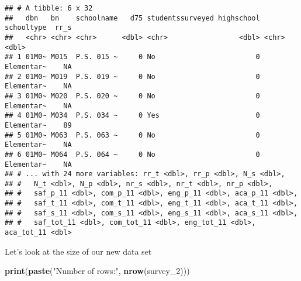 \documentclass[]{article}
\newenvironment{Shaded}{\begin{snugshade}}{\end{snugshade}}
\newcommand{\DecValTok}[1]{\textcolor[rgb]{0.00,0.00,0.81}{#1}}
\newcommand{\KeywordTok}[1]{\textcolor[rgb]{0.13,0.29,0.53}{\textbf{#1}}}
\newcommand{\NormalTok}[1]{#1}
\newcommand{\OperatorTok}[1]{\textcolor[rgb]{0.81,0.36,0.00}{\textbf{#1}}}
\newcommand{\StringTok}[1]{\textcolor[rgb]{0.31,0.60,0.02}{#1}}
\begin{document}
\begin{Shaded}
\end{Shaded}

\begin{verbatim}
## # A tibble: 6 x 32
##   dbn   bn    schoolname   d75 studentssurveyed highschool schooltype  rr_s
##   <chr> <chr> <chr>      <dbl> <chr>                 <dbl> <chr>      <dbl>
## 1 01M0~ M015  P.S. 015 ~     0 No                        0 Elementar~    NA
## 2 01M0~ M019  P.S. 019 ~     0 No                        0 Elementar~    NA
## 3 01M0~ M020  P.S. 020 ~     0 No                        0 Elementar~    NA
## 4 01M0~ M034  P.S. 034 ~     0 Yes                       0 Elementar~    89
## 5 01M0~ M063  P.S. 063 ~     0 No                        0 Elementar~    NA
## 6 01M0~ M064  P.S. 064 ~     0 No                        0 Elementar~    NA
## # ... with 24 more variables: rr_t <dbl>, rr_p <dbl>, N_s <dbl>,
## #   N_t <dbl>, N_p <dbl>, nr_s <dbl>, nr_t <dbl>, nr_p <dbl>,
## #   saf_p_11 <dbl>, com_p_11 <dbl>, eng_p_11 <dbl>, aca_p_11 <dbl>,
## #   saf_t_11 <dbl>, com_t_11 <dbl>, eng_t_11 <dbl>, aca_t_11 <dbl>,
## #   saf_s_11 <dbl>, com_s_11 <dbl>, eng_s_11 <dbl>, aca_s_11 <dbl>,
## #   saf_tot_11 <dbl>, com_tot_11 <dbl>, eng_tot_11 <dbl>, aca_tot_11 <dbl>
\end{verbatim}

Let's look at the size of our new data set

\begin{Shaded}
\begin{Highlighting}[]
\KeywordTok{print}\NormalTok{(}\KeywordTok{paste}\NormalTok{(}\StringTok{"Number of rows:"}\NormalTok{, }\KeywordTok{nrow}\NormalTok{(survey_}\DecValTok{2}\NormalTok{)))}
\end{Highlighting}
\end{Shaded}
\end{document}
